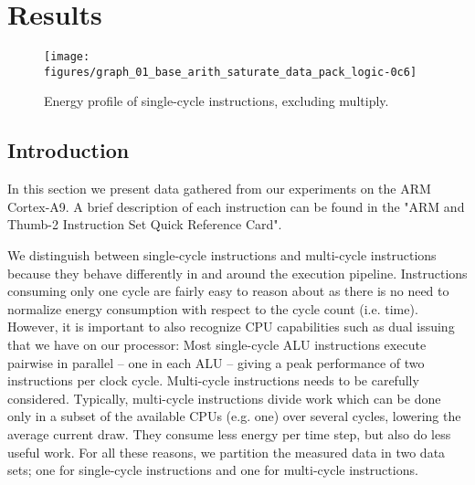 \section{Results}

%
%
%
%

\begin{figure*}[ht]
    \centering
    \texttt{[image: figures/graph\_01\_base\_arith\_saturate\_data\_pack\_logic-0c6]}
    \caption{Energy profile of single-cycle instructions, excluding multiply.}
    \label{fig:singlecycle}
\end{figure*}



\subsection{Introduction}
In this section we present data gathered from our experiments on the ARM
Cortex-A9. A brief description of each instruction can be found in the "ARM and
Thumb-2 Instruction Set Quick Reference Card"\cite{armasmref}.

We distinguish between single-cycle instructions and multi-cycle instructions
because they behave differently in and around the execution pipeline.
Instructions consuming only one cycle are fairly easy to reason about as there
is no need to normalize energy consumption with respect to the cycle count (i.e.
time). However, it is important to also recognize CPU capabilities such as dual
issuing that we have on our processor: Most single-cycle ALU instructions
execute pairwise in parallel -- one in each ALU -- giving a peak performance of
two instructions per clock cycle. Multi-cycle instructions needs to be carefully
considered. Typically, multi-cycle instructions divide work which can be done
only in a subset of the available CPUs (e.g. one) over several cycles, lowering
the average current draw. They consume less energy per time step, but also do
less useful work. For all these reasons, we partition the measured data in two
data sets; one for single-cycle instructions and one for multi-cycle
instructions.

